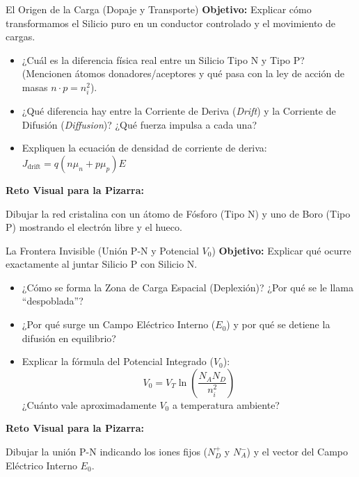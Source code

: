 \documentclass[11pt, a4paper]{article}
\newenvironment{reto}{%
    \vspace{0.3cm}
    \noindent\textbf{\faChalkboard \quad Reto Visual para la Pizarra: } \itshape
}{%
    \vspace{0.2cm}
}
\begin{document}
\begin{mision}{El Origen de la Carga (Dopaje y Transporte)}
\textbf{Objetivo:} Explicar cómo transformamos el Silicio puro en un conductor controlado y el movimiento de cargas.
\begin{itemize}
    \item ¿Cuál es la diferencia física real entre un Silicio Tipo N y Tipo P? (Mencionen átomos donadores/aceptores y qué pasa con la ley de acción de masas $n \cdot p = n_i^2$).
    \item ¿Qué diferencia hay entre la Corriente de Deriva (\textit{Drift}) y la Corriente de Difusión (\textit{Diffusion})? ¿Qué fuerza impulsa a cada una?
    \item Expliquen la ecuación de densidad de corriente de deriva: 
    $J_{\text{drift}} = q(n\mu_n + p\mu_p)E$
\end{itemize}
\begin{reto}
Dibujar la red cristalina con un átomo de Fósforo (Tipo N) y uno de Boro (Tipo P) mostrando el electrón libre y el hueco.
\end{reto}
\end{mision}

\begin{mision}{La Frontera Invisible (Unión P-N y Potencial $V_0$)}
\textbf{Objetivo:} Explicar qué ocurre exactamente al juntar Silicio P con Silicio N.
\begin{itemize}
    \item ¿Cómo se forma la Zona de Carga Espacial (Deplexión)? ¿Por qué se le llama ``despoblada''?
    \item ¿Por qué surge un Campo Eléctrico Interno ($E_0$) y por qué se detiene la difusión en equilibrio?
    \item Explicar la fórmula del Potencial Integrado ($V_0$):
    \begin{equation*}
        V_0 = V_T \ln \left( \frac{N_A N_D}{n_i^2} \right)
    \end{equation*}
    ¿Cuánto vale aproximadamente $V_0$ a temperatura ambiente?
\end{itemize}
\begin{reto}
Dibujar la unión P-N indicando los iones fijos ($N_D^+$ y $N_A^-$) y el vector del Campo Eléctrico Interno $E_0$.
\end{reto}
\end{mision}

\newpage
\end{document}
